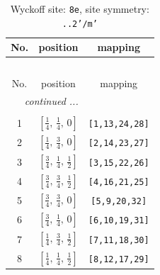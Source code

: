 \documentclass[fleqn,8pt]{jsarticle}
\begin{document}
\renewcommand{\arraystretch}{1.2}
\begin{longtable}{ccc}
\caption{Wyckoff site: {\tt 8e}, site symmetry: {\tt ..2'/m'}}
 \\
 \hline \hline
No. & position & mapping \\ \hline \endfirsthead

\multicolumn{2}{l}{\tablename\ \thetable{}} \\
 \hline \hline
No. & position & mapping \\ \hline \endhead

 \hline \hline
\multicolumn{2}{r}{\footnotesize\it continued ...} \\ \endfoot

 \hline \hline
\multicolumn{2}{r}{} \\ \endlastfoot

1 & $\left[ \frac{1}{4},\, \frac{1}{4},\, 0 \right]$ & {\tt [1,13,24,28]} \\ \hline
2 & $\left[ \frac{1}{4},\, \frac{3}{4},\, 0 \right]$ & {\tt [2,14,23,27]} \\ \hline
3 & $\left[ \frac{3}{4},\, \frac{1}{4},\, \frac{1}{2} \right]$ & {\tt [3,15,22,26]} \\ \hline
4 & $\left[ \frac{3}{4},\, \frac{3}{4},\, \frac{1}{2} \right]$ & {\tt [4,16,21,25]} \\ \hline
5 & $\left[ \frac{3}{4},\, \frac{3}{4},\, 0 \right]$ & {\tt [5,9,20,32]} \\ \hline
6 & $\left[ \frac{3}{4},\, \frac{1}{4},\, 0 \right]$ & {\tt [6,10,19,31]} \\ \hline
7 & $\left[ \frac{1}{4},\, \frac{3}{4},\, \frac{1}{2} \right]$ & {\tt [7,11,18,30]} \\ \hline
8 & $\left[ \frac{1}{4},\, \frac{1}{4},\, \frac{1}{2} \right]$ & {\tt [8,12,17,29]} \\
\end{longtable}
\renewcommand{\arraystretch}{1.2}
\end{document}

